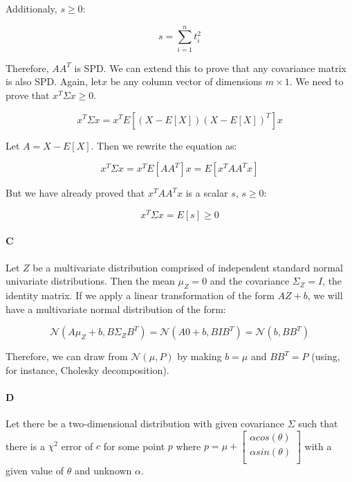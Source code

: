 \documentclass[12pt]{article}
\begin{document}
Additionaly, $s\geq 0$:

\[s = \displaystyle\sum_{i=1}^n{t_i^2}\]

Therefore, $AA^T$ is SPD. We can extend this to prove that any covariance matrix is also SPD. Again, let$x$ be any column vector of dimensions $m\times1$. We need to prove that $x^T\Sigma x \geq 0$.

\[
x^T\Sigma x=x^TE\left[\left(X-E[X]\right)\left(X-E[X]\right)^T\right]x
\]

Let $A=X-E[X]$. Then we rewrite the equation as:

\[
x^T\Sigma x=x^TE\left[AA^T\right]x = E\left[x^TAA^Tx\right]
\]

But we have already proved that $x^TAA^Tx$ is a scalar $s$, $s \geq 0$:

\[
x^T\Sigma x  =E\left[s\right] \geq 0
\]

\paragraph{C}
Let $Z$ be a multivariate distribution comprised of independent standard normal univariate distributions. Then the mean $\mu_Z = 0$ and the covariance $\Sigma_Z=I$, the identity matrix. If we apply a linear transformation of the form $AZ + b$, we will have a multivariate normal distribution of the form:

\[
\mathcal{N}\left(A\mu_Z + b, B\Sigma_Z B^T\right) = \mathcal{N}\left(A0 + b, BIB^T\right) = \mathcal{N}\left(b, BB^T\right)
\]

Therefore, we can draw from $\mathcal{N}\left(\mu,P\right)$ by making $b=\mu$ and $BB^T=P$ (using, for instance, Cholesky decomposition).

\paragraph{D}
Let there be a two-dimensional distribution with given covariance $\Sigma$ such that there is a $\chi^2$ error of $c$ for some point $p$ where $p = \mu +
\left[ {\begin{smallmatrix}
\alpha cos(\theta)  \\
\alpha sin(\theta)  \\
 \end{smallmatrix} } \right]$
with a given value of $\theta$ and unknown $\alpha$.
\end{document}
